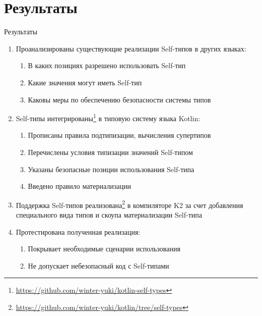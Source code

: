 \documentclass[handout,aspectratio=169,usenames,dvipsnames]{beamer}
\begin{document}
    \section{Результаты}

    \begin{frame}{Результаты}

        \begin{enumerate}
            \item Проанализированы существующие реализации Self-типов в других языках:
            \begin{enumerate}
                \item В каких позициях разрешено использовать Self-тип
                \item Какие значения могут иметь Self-тип
                \item Каковы меры по обеспечению безопасности системы типов
            \end{enumerate}
            \item Self-типы интегрированы\footnote{\url{https://github.com/winter-yuki/kotlin-self-types}} в типовую систему языка Kotlin:
            \begin{enumerate}
                \item Прописаны правила подтипизации, вычисления супертипов
                \item Перечислены условия типизации значений Self-типом
                \item Указаны безопасные позиции использования Self-типа
                \item Введено правило материализации
            \end{enumerate}
            \item Поддержка Self-типов реализована\footnote{\url{https://github.com/winter-yuki/kotlin/tree/self-types}} в компиляторе K2 за счет добавления специального вида типов и скоупа материализации Self-типа
            \item Протестирована полученная реализация:
            \begin{enumerate}
                \item Покрывает необходимые сценарии использования
                \item Не допускает небезопасный код с Self-типами
            \end{enumerate}
        \end{enumerate}
    \end{frame}
\end{document}
